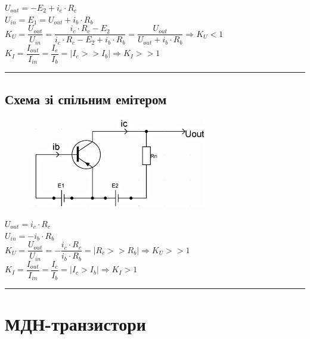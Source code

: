 \documentclass[14pt,a4paper]{scrartcl}
\begin{document}
\begin{center}
$U_{out}=-E_2+i_c\cdot{R_c}$\\[0.5cm]

$U_{in}=E_1=U_{out}+i_b\cdot{R_b}$\\[0.5cm]

$K_U=\dfrac{U_{out}}{U_{in}}=\dfrac{i_c\cdot{R_c}-E_2}{i_c\cdot{R_c}-E_2+i_b\cdot{R_b}}=\dfrac{U_{out}}{U_{out}+i_b\cdot{R_b}}\Rightarrow\boxed{K_U<1}$\\[0.5cm]

$K_I=\dfrac{I_{out}}{I_{in}}=\dfrac{I_e}{I_b}=\left|I_e>>I_b\right|\Rightarrow\boxed{K_I>>1}$
\end{center}
\medskip\hrule\medskip
\newpage
\subsection{Схема зі спільним емітером}
\begin{figure}[!h]\TopFloatBoxes\CenterFloatBoxes
{}
{\includegraphics[width=0.7\textwidth]{comem}}
 \end{figure}

\begin{center}
$U_{out}=i_c\cdot{R_c}$\\[0.5cm]

$U_{in}=-i_b\cdot{R_b}$\\[0.5cm]

$K_U=\dfrac{U_{out}}{U_{in}}=-\dfrac{i_c\cdot{R_c}}{i_b\cdot{R_b}}=\left|R_c>>R_b\right|\Rightarrow\boxed{K_U>>1}$\\[0.5cm]

$K_I=\dfrac{I_{out}}{I_{in}}=\dfrac{I_c}{I_b}=\left|I_c>I_b\right|\Rightarrow\boxed{K_I>1}$
\end{center}

\medskip\hrule\medskip
\newpage


 \section{МДН-транзистори}
\end{document}
